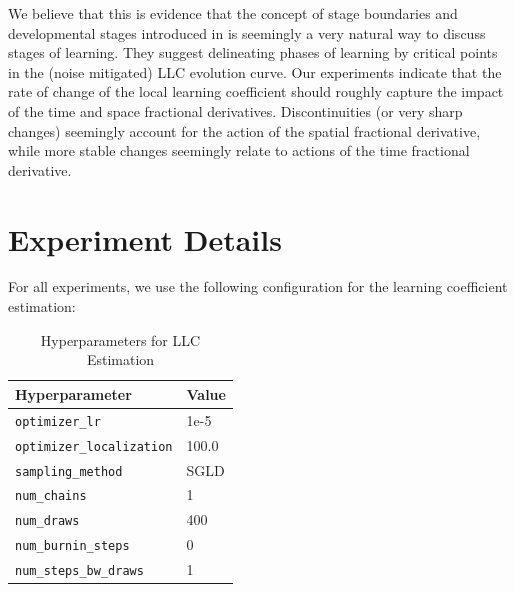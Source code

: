 \documentclass{article} %
\theoremstyle{definition}
\begin{document}
We believe that this is evidence that the concept of stage boundaries and developmental stages introduced in \citep{wang2024loss} is seemingly a very natural way to discuss stages of learning. They suggest delineating phases of learning by critical points in the (noise mitigated) LLC evolution curve. Our experiments indicate that the rate of change of the local learning coefficient should roughly capture the impact of the time and space fractional derivatives. Discontinuities (or very sharp changes) seemingly account for the action of the spatial fractional derivative, while more stable changes seemingly relate to actions of the time fractional derivative.

\section{Experiment Details}\label{app:exp_details}

For all experiments, we use the following configuration for the learning coefficient estimation:
\begin{table}[h!]\label{app:params}
\caption{Hyperparameters for LLC Estimation}
\centering
\begin{tabular}{|l|l|}
\hline
\textbf{Hyperparameter}       & \textbf{Value}         \\ \hline
\texttt{optimizer\_lr}        & 1e-5                   \\ \hline
\texttt{optimizer\_localization} & 100.0              \\ \hline
\texttt{sampling\_method}     & SGLD                   \\ \hline
\texttt{num\_chains}          & 1                      \\ \hline
\texttt{num\_draws}           & 400                    \\ \hline
\texttt{num\_burnin\_steps}   & 0                      \\ \hline
\texttt{num\_steps\_bw\_draws} & 1                      \\ \hline
\end{tabular}

\label{tab:hyperparams}
\end{table}
\end{document}
